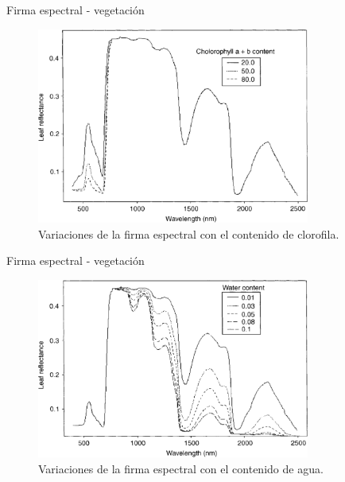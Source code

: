 \documentclass[]{beamer}
\begin{document}
\begin{frame}{Firma espectral - vegetación}
  \begin{figure}
  \centering
  \includegraphics[width=0.8\textwidth]{imagenes/clorovar.png}
  \caption{Variaciones de la firma espectral con el contenido de clorofila.}
  \end{figure}
\end{frame}

\begin{frame}{Firma espectral - vegetación}
  \begin{figure}
  \centering
  \includegraphics[width=0.8\textwidth]{imagenes/vwvar.png}
  \caption{Variaciones de la firma espectral con el contenido de agua.}
  \end{figure}
\end{frame}
\end{document}
